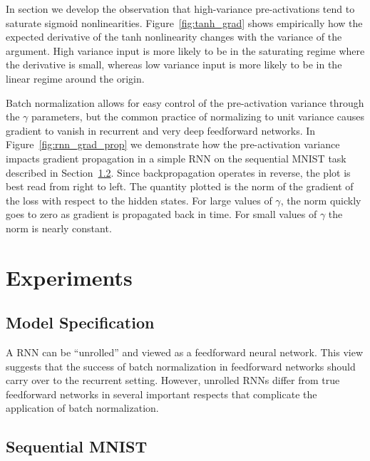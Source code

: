\documentclass{article} %
\begin{document}
In section we develop the observation that high-variance pre-activations tend to saturate sigmoid nonlinearities.
Figure~\ref{fig:tanh_grad} shows empirically how the expected derivative of the tanh nonlinearity changes with the variance of the argument.
High variance input is more likely to be in the saturating regime where the derivative is small,
whereas low variance input is more likely to be in the linear regime around the origin.

Batch normalization allows for easy control of the pre-activation variance through the $\gamma$ parameters,
but the common practice of normalizing to unit variance causes gradient to vanish in recurrent and very deep feedforward networks.
In Figure~\ref{fig:rnn_grad_prop} we demonstrate how the pre-activation variance impacts gradient propagation in a simple RNN on the sequential MNIST task described in Section~\ref{sec:seqmnist}.
Since backpropagation operates in reverse, the plot is best read from right to left.
The quantity plotted is the norm of the gradient of the loss with respect to the hidden states.
For large values of $\gamma$, the norm quickly goes to zero as gradient is propagated back in time.
For small values of $\gamma$ the norm is nearly constant.


\section{Experiments}
\label{sec:experiments}


\subsection{Model Specification}


A RNN can be ``unrolled'' and viewed as a feedforward neural network.
This view suggests that the success of batch normalization in feedforward networks should carry over to the recurrent setting.
However, unrolled RNNs differ from true feedforward networks in several important respects that complicate the application of batch normalization.


\subsection{Sequential MNIST}
\label{sec:seqmnist}
\end{document}
